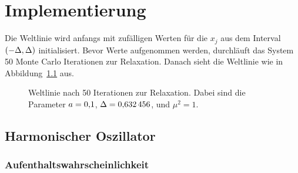 
\chapter{Implementierung}

Die Weltlinie wird anfangs mit zufälligen Werten für die $x_j$ aus dem Interval
$(-\Delta, \Delta)$ initialisiert. Bevor Werte
aufgenommen werden, durchläuft das System \num{50} Monte Carlo Iterationen zur
Relaxation. Danach sieht die Weltlinie wie in Abbildung~\ref{fig:relaxiert}
aus.

\begin{figure}[htbp]
    \centering
    \caption{%
        Weltlinie nach \num{50} Iterationen zur Relaxation. Dabei sind die
        Parameter $a = \num{0.1}$, $\Delta = \num{0.632456}$, und
        $\mu^2 = \num{1}$.
    }
    \label{fig:relaxiert}
\end{figure}

\section{Harmonischer Oszillator}


\subsection{Aufenthaltswahrscheinlichkeit}

